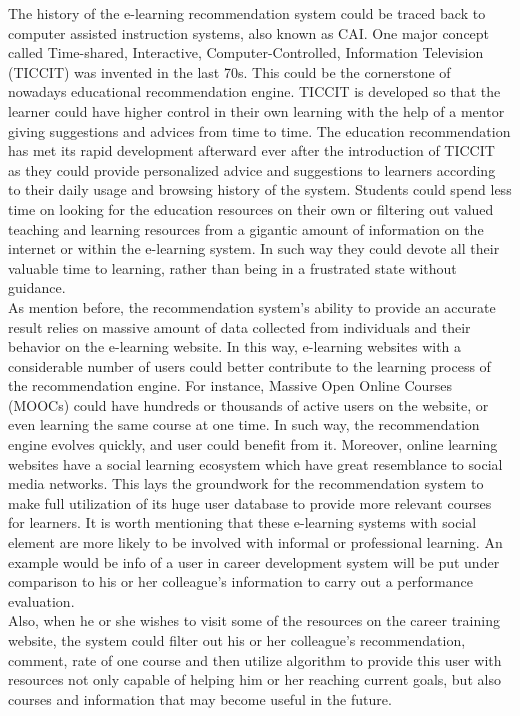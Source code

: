 \documentclass[sigconf]{acmart}
\begin{document}
The history of the e-learning recommendation system could be traced back to computer assisted instruction systems, also known as CAI. One major concept called Time-shared, Interactive, Computer-Controlled, Information Television (TICCIT) was invented in the last 70s. This could be the cornerstone of nowadays educational recommendation engine. TICCIT is developed so that the learner could have higher control in their own learning with the help of a mentor giving suggestions and advices from time to time. The education recommendation has met its rapid development afterward ever after the introduction of TICCIT as they could provide personalized advice and suggestions to learners according to their daily usage and browsing history of the system. Students could spend less time on looking for the education resources on their own or filtering out valued teaching and learning resources from a gigantic amount of information on the internet or within the e-learning system. In such way they could devote all their valuable time to learning, rather than being in a frustrated state without guidance\cite{Maloy2014}.\\
As mention before, the recommendation system's ability to provide an accurate result relies on massive amount of data collected from individuals and their behavior on the e-learning website. In this way, e-learning websites with a considerable number of users could better contribute to the learning process of the recommendation engine. For instance, Massive Open Online Courses (MOOCs) could have hundreds or thousands of active users on the website, or even learning the same course at one time. In such way, the recommendation engine evolves quickly, and user could benefit from it. Moreover, online learning websites have a social learning ecosystem which have great resemblance to social media networks. This lays the groundwork for the recommendation system to make full utilization of its huge user database to provide more relevant courses for learners. It is worth mentioning that these e-learning systems with social element are more likely to be involved with informal or professional learning. An example would be info of a user in career development system will be put under comparison to his or her colleague's information to carry out a performance evaluation\cite{Kingsley2011}.\\ 
Also, when he or she wishes to visit some of the resources on the career training website, the system could filter out his or her colleague's recommendation, comment, rate of one course and then utilize algorithm to provide this user with resources not only capable of helping him or her reaching current goals, but also courses and information that may become useful in the future\cite{lucas2012}.
\end{document}
